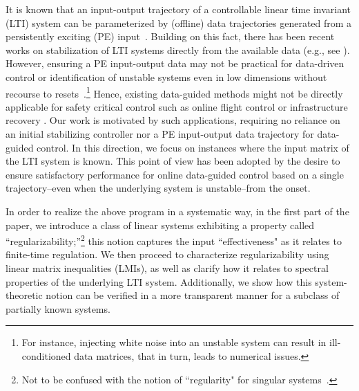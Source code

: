 \documentclass[journal]{IEEEtran}
\theoremstyle{definition}
\theoremstyle{remark}
\begin{document}
	{\color{PineGreen}
It is known that an input-output trajectory of a controllable linear time invariant (LTI) system can be parameterized by (offline) data trajectories generated from a persistently exciting (PE) input~\cite{willems2005note}. Building on this fact, there has been recent works on stabilization of 
LTI systems directly from the available data (e.g., see \cite{de2019formulas, coulson2019deepc, baros2020online, van2019data, yu2021controllability, berberich2021data}).
	However, ensuring a PE input-output data may not be practical for data-driven control or identification of unstable systems even in low dimensions without recourse to resets~\cite{de2019formulas}.\footnote{For instance, injecting white noise into an unstable system can result in ill-conditioned data matrices, that in turn, leads to numerical issues.}
    Hence, existing data-guided methods might not be directly applicable for safety critical control such as
    online flight control \cite{lozano2004robust} or infrastructure recovery \cite{gonzalez2017efficient}.
    Our work is motivated by such applications, requiring no reliance on an initial stabilizing controller nor a PE input-output data trajectory for data-guided control. %
	In this direction, we focus on instances where 
	the input matrix of the LTI system is known.
	This point of view has been adopted by the desire to ensure satisfactory performance for online data-guided control based on a single trajectory--even when the underlying system is unstable--from the onset.
    }
	
	In order to realize the above program in a systematic way, in the first part of the paper, we introduce a class of linear systems exhibiting a property called ``regularizability;''\footnote{Not to be confused with the notion of ``regularity" for singular systems~\cite{ozcaldiran1990regularizability}.} this notion captures the input ``effectiveness" as it relates to finite-time regulation.
	We then proceed to characterize regularizability using linear matrix inequalities (LMIs), as well as clarify  how it relates to spectral properties of the underlying LTI system. 
	Additionally, we show how this system-theoretic notion can be verified in a more transparent manner
    for a subclass of partially known systems.
	
\end{document}
